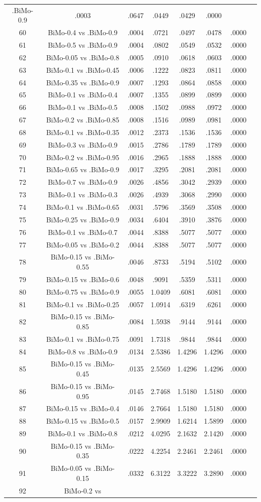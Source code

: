 \documentclass[a4paper,10pt]{article}
\begin{document}
\begin{landscape}
\begin{table}[!htp]
\begin{tabular}{cccccccc}
.BiMo-0.9&.0003&.0647&.0449&.0429&.0000\\60&BiMo-0.4 vs .BiMo-0.9&.0004&.0721&.0497&.0478&.0000\\61&BiMo-0.5 vs .BiMo-0.9&.0004&.0802&.0549&.0532&.0000\\62&BiMo-0.05 vs .BiMo-0.8&.0005&.0910&.0618&.0603&.0000\\63&BiMo-0.1 vs .BiMo-0.45&.0006&.1222&.0823&.0811&.0000\\64&BiMo-0.35 vs .BiMo-0.9&.0007&.1293&.0864&.0858&.0000\\65&BiMo-0.1 vs .BiMo-0.4&.0007&.1355&.0899&.0899&.0000\\66&BiMo-0.1 vs .BiMo-0.5&.0008&.1502&.0988&.0972&.0000\\67&BiMo-0.2 vs .BiMo-0.85&.0008&.1516&.0989&.0981&.0000\\68&BiMo-0.1 vs .BiMo-0.35&.0012&.2373&.1536&.1536&.0000\\69&BiMo-0.3 vs .BiMo-0.9&.0015&.2786&.1789&.1789&.0000\\70&BiMo-0.2 vs .BiMo-0.95&.0016&.2965&.1888&.1888&.0000\\71&BiMo-0.65 vs .BiMo-0.9&.0017&.3295&.2081&.2081&.0000\\72&BiMo-0.7 vs .BiMo-0.9&.0026&.4856&.3042&.2939&.0000\\73&BiMo-0.1 vs .BiMo-0.3&.0026&.4939&.3068&.2990&.0000\\74&BiMo-0.1 vs .BiMo-0.65&.0031&.5796&.3569&.3508&.0000\\75&BiMo-0.25 vs .BiMo-0.9&.0034&.6404&.3910&.3876&.0000\\76&BiMo-0.1 vs .BiMo-0.7&.0044&.8388&.5077&.5077&.0000\\77&BiMo-0.05 vs .BiMo-0.2&.0044&.8388&.5077&.5077&.0000\\78&BiMo-0.15 vs .BiMo-0.55&.0046&.8733&.5194&.5102&.0000\\79&BiMo-0.15 vs .BiMo-0.6&.0048&.9091&.5359&.5311&.0000\\80&BiMo-0.75 vs .BiMo-0.9&.0055&1.0409&.6081&.6081&.0000\\81&BiMo-0.1 vs .BiMo-0.25&.0057&1.0914&.6319&.6261&.0000\\82&BiMo-0.15 vs .BiMo-0.85&.0084&1.5938&.9144&.9144&.0000\\83&BiMo-0.1 vs .BiMo-0.75&.0091&1.7318&.9844&.9844&.0000\\84&BiMo-0.8 vs .BiMo-0.9&.0134&2.5386&1.4296&1.4296&.0000\\85&BiMo-0.15 vs .BiMo-0.45&.0135&2.5569&1.4296&1.4296&.0000\\86&BiMo-0.15 vs .BiMo-0.95&.0145&2.7468&1.5180&1.5180&.0000\\87&BiMo-0.15 vs .BiMo-0.4&.0146&2.7664&1.5180&1.5180&.0000\\88&BiMo-0.15 vs .BiMo-0.5&.0157&2.9909&1.6214&1.5899&.0000\\89&BiMo-0.1 vs .BiMo-0.8&.0212&4.0295&2.1632&2.1420&.0000\\90&BiMo-0.15 vs .BiMo-0.35&.0222&4.2254&2.2461&2.2461&.0000\\91&BiMo-0.05 vs .BiMo-0.15&.0332&6.3122&3.3222&3.2890&.0000\\92&BiMo-0.2 vs 
\end{tabular}
\end{table}
\end{landscape}
\end{document}
